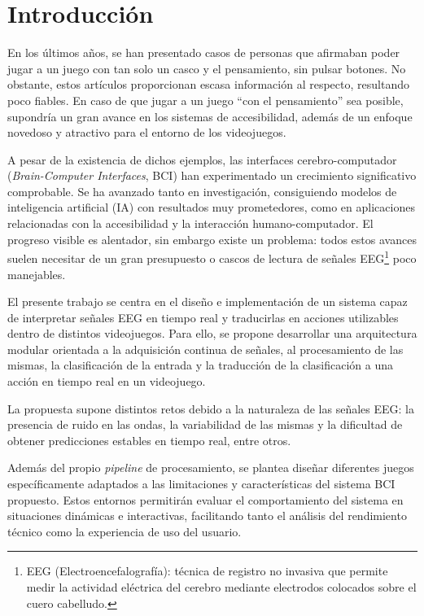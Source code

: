 \chapter{Introducción}
\label{cap:introduccion}

En los últimos años, se han presentado casos de personas que afirmaban poder
jugar a un juego con tan solo un casco y el pensamiento, sin pulsar botones. No
obstante, estos artículos proporcionan escasa información al respecto,
resultando poco fiables. En caso de que jugar a un juego ``con el pensamiento''
sea posible, supondría un gran avance en los sistemas de accesibilidad, además
de un enfoque novedoso y atractivo para el entorno de los videojuegos.

A pesar de la existencia de dichos ejemplos, las interfaces cerebro-computador
(\textit{Brain-Computer Interfaces}, BCI) han experimentado un crecimiento
significativo comprobable. Se ha avanzado tanto en investigación, consiguiendo
modelos de inteligencia artificial (IA) con resultados muy prometedores, como
en aplicaciones relacionadas con la accesibilidad y la interacción
humano-computador. El progreso visible es alentador, sin embargo existe un
problema: todos estos avances suelen necesitar de un gran presupuesto o cascos
de lectura de señales EEG\footnote{EEG (Electroencefalografía): técnica de
    registro no invasiva que permite medir la actividad eléctrica del cerebro
    mediante electrodos colocados sobre el cuero cabelludo.} poco manejables.

El presente trabajo se centra en el diseño e implementación de un sistema capaz
de interpretar señales EEG en tiempo real y traducirlas en acciones utilizables
dentro de distintos videojuegos. Para ello, se propone desarrollar una
arquitectura modular orientada a la adquisición continua de señales, al
procesamiento de las mismas, la clasificación de la entrada y la traducción de
la clasificación a una acción en tiempo real en un videojuego.

La propuesta supone distintos retos debido a la naturaleza de las señales EEG:
la presencia de ruido en las ondas, la variabilidad de las mismas y la
dificultad de obtener predicciones estables en tiempo real, entre otros.

Además del propio \textit{pipeline} de procesamiento, se plantea diseñar
diferentes juegos específicamente adaptados a las limitaciones y
características del sistema BCI propuesto. Estos entornos permitirán evaluar el
comportamiento del sistema en situaciones dinámicas e interactivas, facilitando
tanto el análisis del rendimiento técnico como la experiencia de uso del
usuario.

